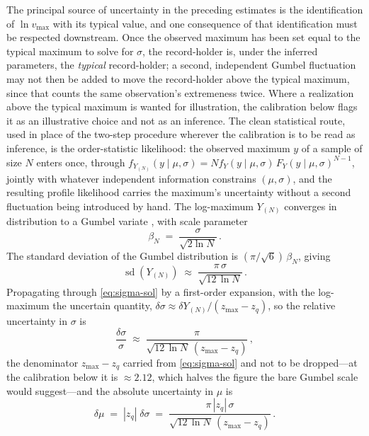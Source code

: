 \documentclass{article}
\begin{document}
The principal source of uncertainty in the preceding estimates is the identification of $\ln v_{\max}$ with its typical value, and one consequence of that identification must be respected downstream. Once the observed maximum has been set equal to the typical maximum to solve for $\sigma$, the record-holder is, under the inferred parameters, the \emph{typical} record-holder; a second, independent Gumbel fluctuation may not then be added to move the record-holder above the typical maximum, since that counts the same observation's extremeness twice. Where a realization above the typical maximum is wanted for illustration, the calibration below flags it as an illustrative choice and not as an inference. The clean statistical route, used in place of the two-step procedure wherever the calibration is to be read as inference, is the order-statistic likelihood: the observed maximum $y$ of a sample of size $N$ enters once, through $f_{Y_{(N)}}(y \mid \mu, \sigma) = N f_Y(y \mid \mu, \sigma)\, F_Y(y \mid \mu, \sigma)^{N-1}$, jointly with whatever independent information constrains $(\mu, \sigma)$, and the resulting profile likelihood carries the maximum's uncertainty without a second fluctuation being introduced by hand. The log-maximum
$Y_{(N)}$ converges in distribution to a Gumbel variate
\cite{fisher1928,gnedenko1943}, with scale parameter
\begin{equation}\label{eq:gumbel-scale}
  \beta_N
  \;=\;
  \frac{\sigma}{\sqrt{2\ln N}}\,.
\end{equation}
The standard deviation of the Gumbel distribution is
$(\pi/\sqrt{6})\,\beta_N$, giving
\begin{equation}\label{eq:sd-logmax}
  \operatorname{sd}(Y_{(N)})
  \;\approx\;
  \frac{\pi\,\sigma}{\sqrt{12\,\ln N}}\,.
\end{equation}
Propagating through \eqref{eq:sigma-sol} by a first-order expansion, with the log-maximum the uncertain quantity, $\delta\sigma \approx \delta Y_{(N)}/(z_{\max} - z_q)$, so the relative uncertainty in $\sigma$ is
\begin{equation}\label{eq:rel-uncert-sigma}
  \frac{\delta\sigma}{\sigma}
  \;\approx\;
  \frac{\pi}{\sqrt{12\,\ln N}\,(z_{\max} - z_q)}\,,
\end{equation}
the denominator $z_{\max} - z_q$ carried from \eqref{eq:sigma-sol} and not to be dropped---at the calibration below it is $\approx 2.12$, which halves the figure the bare Gumbel scale would suggest---and the absolute uncertainty in $\mu$ is
\begin{equation}\label{eq:abs-uncert-mu}
  \delta\mu
  \;=\;
  |z_q|\;\delta\sigma
  \;=\;
  \frac{\pi\,|z_q|\,\sigma}{\sqrt{12\,\ln N}\,(z_{\max} - z_q)}\,.
\end{equation}
\end{document}
